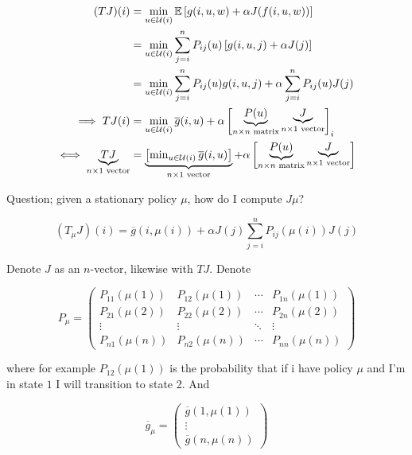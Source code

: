 \begin{align*}
(TJ)(i) & = \min_{u \in \mathcal{U}(i)} \mathbb{E}\left[g(i, u, w) + \alpha J(f(i,u,w)) \right]
\\ & = \min_{u \in \mathcal{U}(i)} \sum_{j=i}^n P_{ij}(u)   \left[g(i, u, j) + \alpha J(j) \right]
\\ & = \min_{u \in \mathcal{U}(i)} \sum_{j=i}^n P_{ij}(u) g(i, u, j)   + \alpha  \sum_{j=i}^n P_{ij}(u) J(j)
\\ \implies TJ(i)  & =  \min_{u \in \mathcal{U}(i)} \overline{g}(i,u)   + \alpha  \begin{bmatrix} \underbrace{P(u)}_{n \times n \text{ matrix}} \underbrace{J}_{n \times 1 \text{ vector}} \end{bmatrix} _i
\\ \iff \underbrace{TJ}_{n \times 1 \text{ vector}}  & = \underbrace{ \begin{bmatrix} \min_{u \in \mathcal{U}(i)} \overline{g}(i,u)  \end{bmatrix}}_{n \times 1 \text{ vector}} + \alpha  \begin{bmatrix} \underbrace{P(u)}_{n \times n \text{ matrix}} \underbrace{J}_{n \times 1 \text{ vector}} \end{bmatrix}
\end{align*}

Question; given a stationary policy \(\mu\), how do I compute \(J \mu\)?

\[
(T_\mu J)(i) = \overline{g}(i,\mu(i) )  + \alpha J(j)  \sum_{j=i}^n P_{ij}(\mu (i)) J(j)
\]

Denote \(J\) as an \(n\)-vector, likewise with \(TJ\). Denote

\[
P_\mu = \begin{pmatrix}
P_{11}(\mu(1)) & P_{12}(\mu(1)) & \cdots & P_{1n}(\mu(1))  \\
P_{21}(\mu(2)) & P_{22}(\mu(2)) & \cdots & P_{2n}(\mu(2))  \\
\vdots & \vdots & \ddots & \vdots \\
P_{n1}(\mu(n)) & P_{n2}(\mu(n)) & \cdots & P_{nn}(\mu(n)) 
\end{pmatrix}
\]

where for example \( P_{12}(\mu(1))\) is the probability that if i have policy \(\mu\) and I'm in state \(1\) I will transition to state 2. And

\[
\overline{g}_\mu = \begin{pmatrix}
\overline{g}(1, \mu(1)) \\
\vdots \\
\overline{g}(n, \mu(n))
\end{pmatrix}
\]

